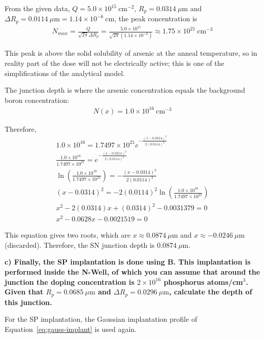 From the given data, $Q = 5.0 \times 10^{15} \ \mathrm{cm^{-2}}$, $R_p = 0.0314 \ \mu\mathrm{m}$ and $\Delta R_p = 0.0114 \ \mu\mathrm{m} = 1.14 \times 10^{-6} \ \mathrm{cm}$, the peak concentration is
\begin{gather*}
    N_{max}=\frac{Q}{\sqrt{2\pi}\Delta R_p}
    =\frac{5.0 \times 10^{15}}{\sqrt{2\pi}(1.14 \times 10^{-6})} \approx 1.75 \times 10^{21} \ \mathrm{cm^{-3}}
\end{gather*}

This peak is above the solid solubility of arsenic at the anneal temperature, so in reality part of the dose will not be electrically active; this is one of the simplifications of the analytical model.

The junction depth is where the arsenic concentration equals the background boron concentration:
\begin{gather*}
    N(x)=1.0 \times 10^{16} \ \mathrm{cm^{-3}}
\end{gather*}

Therefore,
\begin{gather*}
    1.0 \times 10^{16} = 1.7497 \times 10^{21}e^{-\frac{(x-0.0314)^2}{2(0.0114)^2}} \\
    \frac{1.0 \times 10^{16}}{1.7497 \times 10^{21}} = e^{-\frac{(x-0.0314)^2}{2(0.0114)^2}} \\
    \ln\left(\frac{1.0 \times 10^{16}}{1.7497 \times 10^{21}}\right) = -\frac{(x-0.0314)^2}{2(0.0114)^2} \\
    (x-0.0314)^2 = -2(0.0114)^2
    \ln\left(\frac{1.0 \times 10^{16}}{1.7497 \times 10^{21}}\right) \\
    x^2 - 2(0.0314)x + (0.0314)^2 - 0.0031379 = 0 \\
    x^2 - 0.0628x - 0.0021519 = 0
\end{gather*}

This equation gives two roots, which are $x \approx 0.0874 \ \mu\mathrm{m}$ and $x \approx -0.0246 \ \mu\mathrm{m}$ (discarded). Therefore, the SN junction depth is $0.0874 \ \mu\mathrm{m}$.


\vspace{0.5em}
\noindent \textbf{c) Finally, the SP implantation is done using B. This implantation is performed inside the N-Well, of which you can assume that around the junction the doping concentration is $2 \times 10^{16}$ phosphorus atoms/cm$^3$. Given that $R_p = 0.0685 \ \mu\mathrm{m}$ and $\Delta R_p = 0.0296 \ \mu\mathrm{m}$, calculate the depth of this junction.}

For the SP implantation, the Gaussian implantation profile of Equation~\eqref{eq:gauss-implant} is used again.

